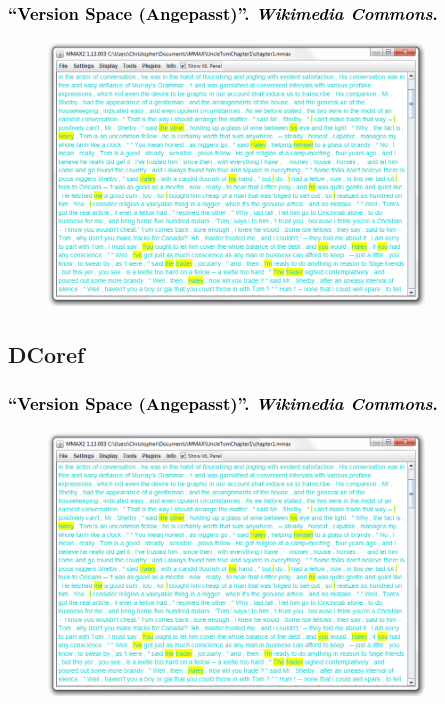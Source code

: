 \documentclass[xcolor=dvipsnames]{beamer}
\begin{document}
\begin{frame}\frametitle{\textcolor{black}{``{Version Space (Angepasst)}''. \emph{Wikimedia Commons}.}}
\begin{figure}
\includegraphics[height=7cm]{cm_mmax.jpg}
\end{figure}

\end{frame}


\subsection{DCoref}


\begin{frame}\frametitle{\textcolor{black}{``{Version Space (Angepasst)}''. \emph{Wikimedia Commons}.}}
\begin{figure}
\includegraphics[height=7cm]{cm_mmax.jpg}
\end{figure}

\end{frame}

\addtocounter{framenumber}{-3}
\end{document}

